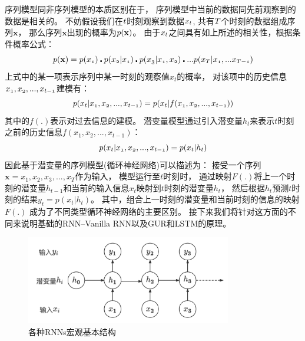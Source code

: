       序列模型同非序列模型的本质区别在于，
      序列模型中当前的数据同先前观察到的数据是相关的。
      不妨假设我们在$\mathnormal{t}$时刻观察到数据$\mathnormal{x_t}$,
      共有$\mathnormal{T}$个时刻的数据组成序列$\mathbf{x}$，
      那么序列$\mathbf{x}$出现的概率为$\mathnormal{p(\mathbf{x})}$。
      由于$\mathnormal{x_t}$之间具有如上所述的相关性，根据条件概率公式：
      \begin{equation} \label{seq_x_prob}
        \mathnormal{p(\mathbf{x})} = 
        \mathnormal{p(x_1)\centerdot p(x_2 | x_1) \centerdot 
        p(x_3 | x_1,x_2) \centerdot ... p(x_T| x_1,...x_{T-1}) }
      \end{equation}
      上式中的某一项表示序列中某一时刻的观察值$x_t$的概率，
      对该项中的历史信息$\mathnormal{x_1,x_2,...,x_{t-1}}$建模有：
      \begin{equation} \label{xt_prob_without_ht}
        \mathnormal{p(x_t | x_1, x_2, ..., x_{t-1})} = \mathnormal{
          p(x_t | f(x_1, x_2,...,x_{t-1}))
        }
      \end{equation}
      其中的$f(.)$表示对过去信息的建模。
      潜变量模型通过引入潜变量$h_t$来表示$t$时刻之前的历史信息$f(x_1, x_2,...,x_{t-1})$：
      \begin{equation} \label{xt_prob_with_ht}
        \mathnormal{p(x_t | x_1, x_2, ..., x_{t-1})} = \mathnormal{
          p(x_t | h_t)
        }
      \end{equation}
      因此基于潜变量的序列模型(循环神经网络)可以描述为：
      接受一个序列$\mathbf{x} ={x_1, x_2, x_3,..., x_T}$作为输入，
      模型运行至$t$时刻时，
      通过映射$F(.)$将上一个时刻的潜变量$h_{t-1}$和当前的输入信息$x_t$映射到$t$时刻的潜变量$h_t$，
      然后根据$h_t$预测$t$时刻的结果$y_t = p(x_t | h_t)$。
      其中，组合上一时刻的潜变量和当前时刻的信息的映射$F(.)$
      成为了不同类型循环神经网络的主要区别。
      接下来我们将针对这方面的不同来说明基础的RNN--Vanilla RNN以及GUR和LSTM的原理。

      \begin{figure}[htbp]
        \centering
        \includegraphics[width=0.8\textwidth]{Figures/RNNs.png}
        \caption{各种RNNs宏观基本结构}
        \label{pic:RNNs}
      \end{figure}
      

